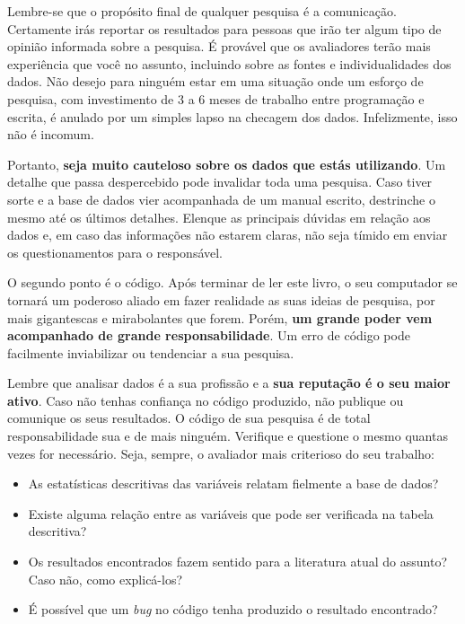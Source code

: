 \documentclass[
  11pt,
]{book}
\providecommand{\tightlist}{%
  \setlength{\itemsep}{0pt}\setlength{\parskip}{0pt}}
\begin{document}
Lembre-se que o propósito final de qualquer pesquisa é a comunicação. Certamente irás reportar os resultados para pessoas que irão ter algum tipo de opinião informada sobre a pesquisa. É provável que os avaliadores terão mais experiência que você no assunto, incluindo sobre as fontes e individualidades dos dados. Não desejo para ninguém estar em uma situação onde um esforço de pesquisa, com investimento de 3 a 6 meses de trabalho entre programação e escrita, é anulado por um simples lapso na checagem dos dados. Infelizmente, isso não é incomum.

Portanto, \textbf{seja muito cauteloso sobre os dados que estás utilizando}. Um detalhe que passa despercebido pode invalidar toda uma pesquisa. Caso tiver sorte e a base de dados vier acompanhada de um manual escrito, destrinche o mesmo até os últimos detalhes. Elenque as principais dúvidas em relação aos dados e, em caso das informações não estarem claras, não seja tímido em enviar os questionamentos para o responsável.

O segundo ponto é o código. Após terminar de ler este livro, o seu computador se tornará um poderoso aliado em fazer realidade as suas ideias de pesquisa, por mais gigantescas e mirabolantes que forem. Porém, \textbf{um grande poder vem acompanhado de grande responsabilidade}. Um erro de código pode facilmente inviabilizar ou tendenciar a sua pesquisa.

Lembre que analisar dados é a sua profissão e a \textbf{sua reputação é o seu maior ativo}. Caso não tenhas confiança no código produzido, não publique ou comunique os seus resultados. O código de sua pesquisa é de total responsabilidade sua e de mais ninguém. Verifique e questione o mesmo quantas vezes for necessário. Seja, sempre, o avaliador mais criterioso do seu trabalho:

\begin{itemize}
\tightlist
\item
  As estatísticas descritivas das variáveis relatam fielmente a base de dados?
\item
  Existe alguma relação entre as variáveis que pode ser verificada na tabela descritiva?
\item
  Os resultados encontrados fazem sentido para a literatura atual do assunto? Caso não, como explicá-los?
\item
  É possível que um \emph{bug} no código tenha produzido o resultado encontrado?
\end{itemize}
\end{document}
